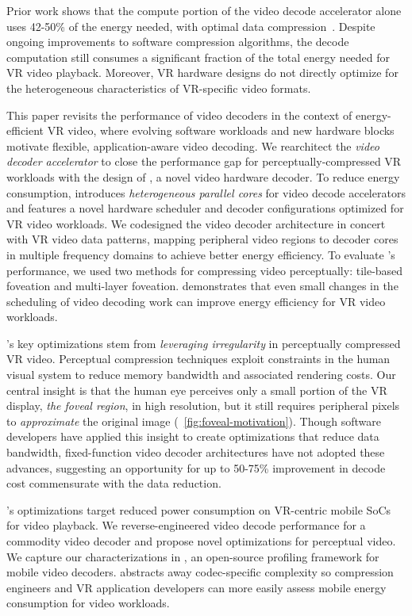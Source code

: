Prior work shows that the compute portion of the video decode accelerator alone uses 42-50\% of the energy needed,  with optimal data compression~\cite{google2018asplos, tikekar18ijssc, 8khevc-ijssc}.
Despite ongoing improvements to software compression algorithms, the decode computation still consumes a significant fraction of the total energy needed for VR video playback.
Moreover, VR hardware designs do not directly optimize for the heterogeneous characteristics of VR-specific video formats.

This paper revisits the performance of video decoders in the context of energy-efficient VR video, where evolving software workloads and new hardware blocks motivate flexible, application-aware video decoding.
We rearchitect the \emph{video decoder accelerator} to close the performance gap for perceptually-compressed VR workloads with the design of \nameArch, a novel video hardware decoder.
To reduce energy consumption, \nameArch introduces \emph{heterogeneous parallel cores} for video decode accelerators and features a novel hardware scheduler and decoder configurations optimized for VR video workloads.
We codesigned the video decoder architecture in concert with VR video data patterns, mapping peripheral video regions to decoder cores in multiple frequency domains to achieve better energy efficiency.
To evaluate \nameArch's performance, we used two methods for compressing video perceptually: tile-based foveation and multi-layer foveation.
\nameArch demonstrates that even small changes in the scheduling of video decoding work can improve energy efficiency for VR video workloads.

\nameArch's key optimizations stem from \emph{leveraging irregularity} in perceptually compressed VR video.
Perceptual compression techniques exploit constraints in the human visual system to reduce memory bandwidth and associated rendering costs.
Our central insight is that the human eye perceives only a small portion of the VR display, \emph{the foveal region}, in high resolution, but it still requires peripheral pixels to \emph{approximate} the original image (~\ref{fig:foveal-motivation}).
Though software developers have applied this insight to create optimizations that reduce data bandwidth, fixed-function video decoder architectures have not adopted these advances, suggesting an opportunity for up to 50-75\% improvement in decode cost commensurate with the data reduction.

\nameArch's optimizations target reduced power consumption on  VR-centric mobile SoCs  for video playback.
We reverse-engineered video decode performance for a commodity video decoder and propose novel optimizations for perceptual video.
We capture our characterizations in \nameArchprof, an open-source profiling framework for mobile video decoders.
\nameArchprof abstracts away codec-specific complexity so compression engineers and VR application developers can more easily assess mobile energy consumption for video workloads.


